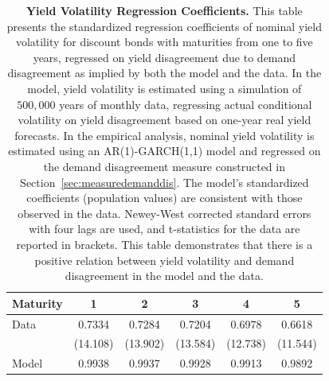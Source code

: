 \documentclass[preprint,11pt,authoryear]{elsarticle}
\theoremstyle{plain}
\begin{document}
\begin{table}[h!]
\centering
\begin{tabular}{lccccc}
\toprule
\textbf{Maturity} & \textbf{1} & \textbf{2} & \textbf{3} & \textbf{4} & \textbf{5} \\ 
\midrule
Data   & 0.7334 & 0.7284 & 0.7204 & 0.6978  & 0.6618 \\ 
    & (14.108) & (13.902) & (13.584) & (12.738) & (11.544) \\ 
\midrule
Model  & 0.9938 & 0.9937 & 0.9928 & 0.9913 & 0.9892 \\ 
\bottomrule
\end{tabular} \\ \vspace{0.2cm}
\caption{\textbf{Yield Volatility Regression Coefficients.} This table presents the standardized regression coefficients of nominal yield volatility for discount bonds with maturities from one to five years, regressed on yield disagreement due to demand disagreement as implied by both the model and the data. In the model, yield volatility is estimated using a simulation of $500,000$ years of monthly data, regressing actual conditional volatility on yield disagreement based on one-year real yield forecasts. In the empirical analysis, nominal yield volatility is estimated using an AR(1)-GARCH(1,1) model and regressed on the demand disagreement measure constructed in Section~\ref{sec:measuredemanddis}. The model's standardized coefficients (population values) are consistent with those observed in the data. Newey-West corrected standard errors with four lags are used, and t-statistics for the data are reported in brackets. This table demonstrates that there is a positive relation between yield volatility and demand disagreement in the model and the data.}
\label{table:regvola}
\end{table}
\end{document}
